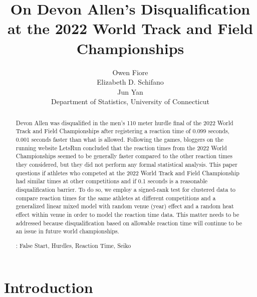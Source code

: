 \documentclass[12pt, letterpaper, titlepage]{article}
\title{On Devon Allen's Disqualification at the 2022 World Track and Field 
Championships}
\author{Owen Fiore\\
  Elizabeth D. Schifano\\
  Jun Yan\\[1ex]
  Department of Statistics, University of Connecticut\\
}
\date{}
\begin{document}
\maketitle

\begin{abstract}
Devon Allen was disqualified in the men's 110 meter hurdle final of the 2022
World Track and Field Championships after registering a reaction time of 0.099 
seconds, 0.001 seconds faster than what is allowed. Following the games, 
bloggers on the running website LetsRun concluded that the reaction times  
from the 2022 World Championships seemed to be generally faster compared to the 
other reaction times they considered, but they did not perform any formal 
statistical analysis. This paper questions if athletes who competed at the 2022
World Track and Field Championship had similar times at other competitions and
if 0.1 seconds is a reasonable disqualification barrier. To do so, we employ a 
signed-rank test for clustered data to compare reaction times for the same 
athletes at different competitions and a generalized linear mixed model 
with random venue (year) effect and a random heat effect within venue 
in order to model the reaction time data. This matter needs to be addressed 
because disqualification based on allowable reaction time will continue to be an
issue in future world championships.


\bigskip{}:
False Start, Hurdles, Reaction Time, Seiko 

\end{abstract}

\doublespace


\section{Introduction}
\label{sec:intro}
\end{document}
